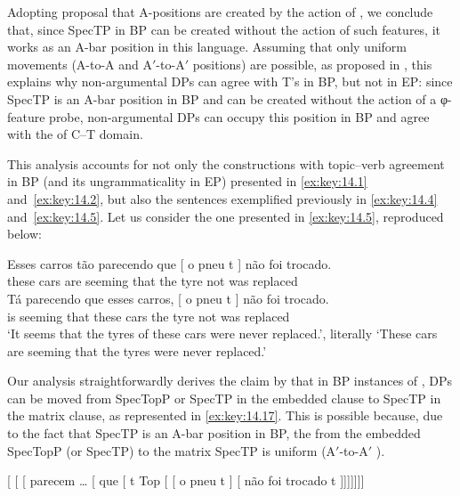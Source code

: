 \documentclass[output=paper]{langsci/langscibook}
\begin{document}
Adopting  proposal that A-positions are created by the
action of , we conclude that, since SpecTP in \gls{BP} can be
created without the action of such features, it works as an A-bar position in
this language. Assuming that only uniform movements (A-to-A and A$'$-to-A$'$
positions) are possible, as proposed in \citet{Chomsky2008}, this explains why
non-argumental DPs can agree with T’s  in BP, but not in EP: since
SpecTP is an A-bar position in \gls{BP} and can be created without the action
of a φ-feature probe, non-argumental DPs can occupy this position in \gls{BP}
and agree with the  of C--T domain.

This analysis accounts for not only the constructions with topic--verb
agreement in \gls{BP} (and its ungrammaticality in EP) presented in
\eqref{ex:key:14.1} and~\eqref{ex:key:14.2}, but also the 
sentences exemplified previously in \eqref{ex:key:14.4}
and~\eqref{ex:key:14.5}. Let us consider the one presented in
\eqref{ex:key:14.5}, reproduced below:

\ea\label{ex:key:14.16}
    \ea
	\gll    Esses carros tão parecendo que [ o pneu t ] não foi trocado.\\
    these cars are seeming that {} the tyre {} {} not was replaced\\
    \ex
    \gll    Tá parecendo que esses carros, [ o pneu t ] não foi trocado.\\
    is seeming that these cars {} the tyre {} {} not was replaced\\
    \glt    ‘It seems that the tyres of these cars were never replaced.’,
            literally ‘These cars are seeming that the tyres were never replaced.’
    \z
\z

Our analysis straightforwardly derives the claim by \citet{NunesMartins2010}
that in \gls{BP} instances of , DPs can be moved from SpecTopP
or SpecTP in the embedded clause to SpecTP in the matrix clause, as
represented in \eqref{ex:key:14.17}. This is possible because, due to the fact that
SpecTP is an A-bar position in BP, the  from the embedded SpecTopP
(or SpecTP) to the matrix SpecTP is uniform (A$'$-to-A$'$ ).

\ea\label{ex:key:14.17}
    {}[ [ [ parecem \dots{} [ que [
    t Top [ [ o pneu t ] [ não foi
    trocado t ]]]]]]]
\z
\end{document}
